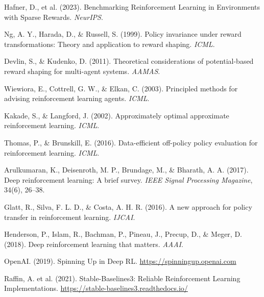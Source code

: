 \documentclass[conference]{IEEEtran}
\begin{document}
\begin{thebibliography}{99}
 Hafner, D., et al. (2023). Benchmarking Reinforcement Learning in Environments with Sparse Rewards. \textit{NeurIPS}.

 Ng, A. Y., Harada, D., \& Russell, S. (1999). Policy invariance under reward transformations: Theory and application to reward shaping. \textit{ICML}.

 Devlin, S., \& Kudenko, D. (2011). Theoretical considerations of potential-based reward shaping for multi-agent systems. \textit{AAMAS}.

 Wiewiora, E., Cottrell, G. W., \& Elkan, C. (2003). Principled methods for advising reinforcement learning agents. \textit{ICML}.

 Kakade, S., \& Langford, J. (2002). Approximately optimal approximate reinforcement learning. \textit{ICML}.

 Thomas, P., \& Brunskill, E. (2016). Data-efficient off-policy policy evaluation for reinforcement learning. \textit{ICML}.

 Arulkumaran, K., Deisenroth, M. P., Brundage, M., \& Bharath, A. A. (2017). Deep reinforcement learning: A brief survey. \textit{IEEE Signal Processing Magazine}, 34(6), 26–38.

 Glatt, R., Silva, F. L. D., \& Costa, A. H. R. (2016). A new approach for policy transfer in reinforcement learning. \textit{IJCAI}.

 Henderson, P., Islam, R., Bachman, P., Pineau, J., Precup, D., \& Meger, D. (2018). Deep reinforcement learning that matters. \textit{AAAI}.

 OpenAI. (2019). Spinning Up in Deep RL. \url{https://spinningup.openai.com}

 Raffin, A. et al. (2021). Stable-Baselines3: Reliable Reinforcement Learning Implementations. \url{https://stable-baselines3.readthedocs.io/}

\end{thebibliography}
\end{document}
